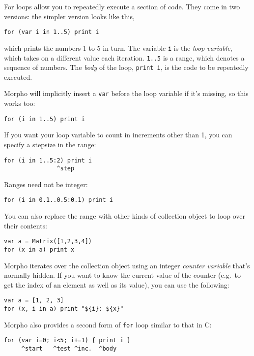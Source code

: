 For loops allow you to repeatedly execute a section of code. They come
in two versions: the simpler version looks like this,

\begin{lstlisting}
for (var i in 1..5) print i
\end{lstlisting}

which prints the numbers 1 to 5 in turn. The variable \texttt{i} is the
\emph{loop variable}, which takes on a different value each iteration.
\texttt{1..5} is a range, which denotes a sequence of numbers. The
\emph{body} of the loop, \texttt{print\ i}, is the code to be repeatedly
executed.

Morpho will implicitly insert a \texttt{var} before the loop variable if
it's missing, so this works too:

\begin{lstlisting}
for (i in 1..5) print i
\end{lstlisting}

If you want your loop variable to count in increments other than 1, you
can specify a stepsize in the range:

\begin{lstlisting}
for (i in 1..5:2) print i
               ^step
\end{lstlisting}

Ranges need not be integer:

\begin{lstlisting}
for (i in 0.1..0.5:0.1) print i
\end{lstlisting}

You can also replace the range with other kinds of collection object to
loop over their contents:

\begin{lstlisting}
var a = Matrix([1,2,3,4])
for (x in a) print x
\end{lstlisting}

Morpho iterates over the collection object using an integer
\emph{counter variable} that's normally hidden. If you want to know the
current value of the counter (e.g.~to get the index of an element as
well as its value), you can use the following:

\begin{lstlisting}
var a = [1, 2, 3]
for (x, i in a) print "${i}: ${x}"
\end{lstlisting}

Morpho also provides a second form of \texttt{for} loop similar to that
in C:

\begin{lstlisting}
for (var i=0; i<5; i+=1) { print i }
     ^start   ^test ^inc.  ^body
\end{lstlisting}

